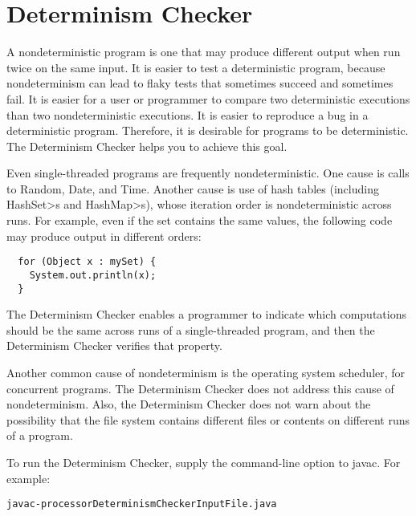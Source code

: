 \htmlhr
\chapter{Determinism Checker\label{determinism-checker}}

A nondeterministic program is one that may produce different output when
run twice on the same input.  It is easier to test a deterministic program,
because nondeterminism can lead to flaky tests that sometimes succeed and
sometimes fail.  It is easier for a user or programmer to compare two
deterministic executions than two nondeterministic executions.  It is
easier to reproduce a bug in a deterministic program.
Therefore, it is desirable for programs to be deterministic.
The Determinism Checker helps you to achieve this goal.

Even single-threaded programs are frequently nondeterministic.
One cause is calls to Random, Date, and Time.
Another cause is use of hash tables (including \<HashSet>s and
\<HashMap>s), whose iteration order is nondeterministic across runs.
For example, even if the set contains the same values, the following code
may produce output in different orders:

\begin{Verbatim}
  for (Object x : mySet) {
    System.out.println(x);
  }
\end{Verbatim}

The Determinism Checker enables a programmer to indicate which
computations should be the same across runs of a single-threaded program,
and then the Determinism Checker verifies that property.

Another common cause of nondeterminism is the operating system scheduler,
for concurrent programs.  The Determinism Checker does not address this
cause of nondeterminism.  Also, the Determinism Checker does not warn
about the possibility that the file system contains different files or
contents on different runs of a program.

To run the Determinism Checker, supply the
command-line option to javac.
For example:

\begin{alltt}
  javac -processor DeterminismChecker InputFile.java
\end{alltt}



